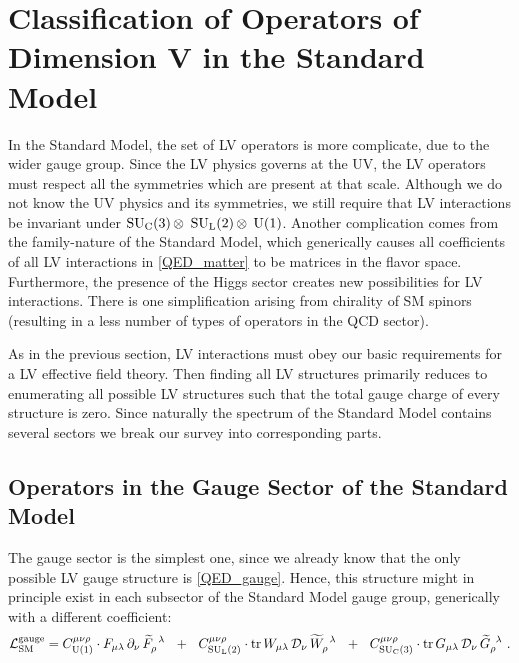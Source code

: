 \documentclass[12pt]{revtex4}
\newcommand{\wt}{\widetilde}
\newcommand{\suc}{{\rm SU}_{\rm C}(3)}
\newcommand{\sul}{{\rm SU}_{\rm L}(2)}
\newcommand{\ue}{{\rm U}(1)}
\begin{document}
\section{Classification of Operators of Dimension V in the Standard Model}

	In the Standard Model, the set of LV operators is more complicate,
	due to the wider gauge group. 
	Since the LV physics governs at the UV, the LV operators must 
	respect all the symmetries which are present at that scale.
	Although we do not know the UV physics and its symmetries, we
	still require that LV interactions be invariant under 
	$ \suc\, \otimes $ $ \sul\, \otimes $ $ \ue $.
	Another complication comes from the family-nature of the
	Standard Model, which generically causes all coefficients
	of all LV interactions in \eqref{QED_matter} to be 
	matrices in the flavor space.
	Furthermore, the presence of the Higgs sector creates new
	possibilities for LV interactions. 
	There is one simplification arising from chirality of
	SM spinors (resulting in a less number of types of operators in the 
	QCD sector).

	As in the previous section, LV interactions must obey 
	our basic requirements for a LV effective field theory.
	Then finding all LV structures primarily reduces to enumerating all 
	possible LV structures
	such that the total gauge charge of every structure is zero.
	Since naturally the spectrum of the Standard Model contains
	several sectors we break our survey into corresponding parts.
	
\subsection{Operators in the Gauge Sector of the Standard Model}

	The gauge sector is the simplest one, since we already know
	that the only possible LV gauge structure is 
	\eqref{QED_gauge}.
	Hence, this structure might in principle exist in each subsector
	of the Standard Model gauge group, generically with a different
	coefficient:
\begin{equation}
\label{SM_gauge}
	\mathcal{L}_{\rm SM}^{\rm gauge} = 
	C_{\ue}^{\mu\nu\rho} \cdot 
	F_{\mu\lambda} \,\partial_\nu\, \wt{F}_\rho^{\phantom{\rho}\lambda}
	~~+~~
	C_{\sul}^{\mu\nu\rho} \cdot 
	{\rm tr}\,
	W_{\mu\lambda} \,\mathcal{D}_\nu\, \wt{W}_\rho^{\phantom{\rho}\lambda}
	~~+~~
	C_{\suc}^{\mu\nu\rho} \cdot 
	{\rm tr}\,
	G_{\mu\lambda} \,\mathcal{D}_\nu\, \wt{G}_\rho^{\phantom{\rho}\lambda}
	~.
\end{equation}
\end{document}

